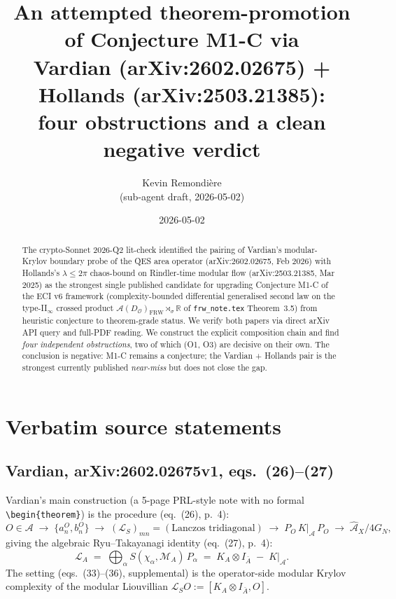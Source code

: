 \documentclass[11pt]{article}
\title{An attempted theorem-promotion of Conjecture M1-C via\\
Vardian (arXiv:2602.02675) + Hollands (arXiv:2503.21385):\\
four obstructions and a clean negative verdict}
\author{Kevin Remondi\`ere\\
\small (sub-agent draft, 2026-05-02)}
\date{2026-05-02}
\newtheorem{theorem}{Theorem}
\theoremstyle{remark}
\newcommand{\AA}{\mathcal{A}}
\newcommand{\OO}{\mathcal{O}}
\newcommand{\R}{\mathbb{R}}
\begin{document}
\maketitle

\begin{abstract}
The crypto-Sonnet 2026-Q2 lit-check identified the pairing of Vardian's
modular-Krylov boundary probe of the QES area operator (arXiv:2602.02675,
Feb 2026) with Hollands's $\lambda \le 2\pi$ chaos-bound on Rindler-time
modular flow (arXiv:2503.21385, Mar 2025) as the strongest single published
candidate for upgrading Conjecture M1-C of the ECI v6 framework
(complexity-bounded differential generalised second law on the type-II$_\infty$
crossed product $\AA(D_\OO)_{\mathrm{FRW}} \rtimes_\sigma \R$ of
\texttt{frw\_note.tex} Theorem~3.5) from heuristic conjecture to
theorem-grade status. We verify both papers via direct arXiv API query and
full-PDF reading. We construct the explicit composition chain and find
\emph{four independent obstructions}, two of which (O1, O3) are decisive on
their own. The conclusion is negative: M1-C remains a conjecture; the
Vardian + Hollands pair is the strongest currently published \emph{near-miss}
but does not close the gap.
\end{abstract}

\section{Verbatim source statements}

\subsection{Vardian, arXiv:2602.02675v1, eqs.~(26)--(27)}

Vardian's main construction (a 5-page PRL-style note with no formal
\verb|\begin{theorem}|) is the procedure (eq.~(26), p.~4):
\begin{equation}
O \in \AA \;\longrightarrow\; \{a^O_n, b^O_n\} \;\longrightarrow\;
(\mathcal{L}_S)_{mn} = (\text{Lanczos tridiagonal})
\;\longrightarrow\; P_O\, K\big|_{\AA}\, P_O
\;\longrightarrow\; \widehat{\mathcal{A}}_X / 4 G_N,
\end{equation}
giving the algebraic Ryu--Takayanagi identity (eq.~(27), p.~4):
\begin{equation}
\mathcal{L}_A \;=\; \bigoplus_\alpha S(\chi_\alpha, \mathcal{M}_A)\, P_\alpha
\;=\; K_A \otimes I_{\bar A} \;-\; K\big|_{\AA}.
\end{equation}
The setting (eqs.~(33)--(36), supplemental) is the operator-side modular
Krylov complexity of the modular Liouvillian
$\mathcal{L}_S O := [K_A \otimes I_{\bar A}, O]$.
\end{document}
